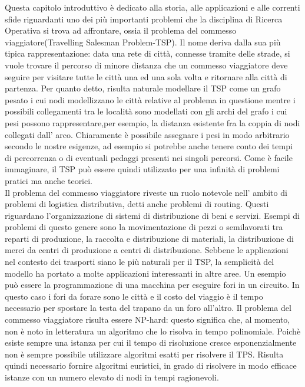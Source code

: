 \documentclass[11pt]{article}
\begin{document}
Questa capitolo introduttivo è dedicato alla storia, alle applicazioni e alle correnti sfide riguardanti uno dei più importanti problemi che la disciplina di Ricerca Operativa si trova ad affrontare, ossia il problema del commesso viaggiatore(Travelling Salesman Problem-TSP). 
Il nome deriva dalla sua più tipica rappresentazione: data una rete di città, connesse tramite delle strade, si vuole trovare il percorso di minore distanza che un commesso viaggiatore deve seguire per visitare tutte le città una ed una sola volta e ritornare alla città di partenza. Per quanto detto, risulta naturale modellare il TSP come un grafo pesato i cui nodi modellizzano le città relative al problema in questione mentre i possibili collegamenti tra le località sono modellati con gli archi del grafo i cui pesi possono rappresentare,per esempio, la distanza esistente fra la coppia di nodi collegati dall' arco. Chiaramente è possibile assegnare i pesi in modo arbitrario secondo le nostre esigenze, ad esempio si potrebbe anche tenere conto dei tempi di percorrenza o di eventuali pedaggi presenti nei singoli percorsi. Come è facile immaginare, il TSP può essere quindi utilizzato per una infinità  di problemi pratici ma anche teorici.\\
Il problema del commesso viaggiatore riveste un ruolo notevole nell' ambito di problemi di logistica distributiva, detti anche problemi di routing. Questi riguardano l'organizzazione di sistemi di distribuzione di beni e servizi. Esempi di problemi di questo genere sono la movimentazione di pezzi o semilavorati tra reparti di produzione, la raccolta e distribuzione di materiali, la distribuzione di merci da centri di produzione a centri di distribuzione.
Sebbene le applicazioni nel contesto dei trasporti siano le più naturali per il TSP, la semplicità del modello ha portato a molte applicazioni interessanti in altre aree. Un esempio può essere la programmazione di una macchina per eseguire fori in un circuito. In questo caso i fori da forare sono le città  e il costo del viaggio è il tempo necessario per spostare la testa del trapano da un foro all'altro. 
Il problema del commesso viaggiatore risulta essere NP-hard: questo significa che, al momento, non è noto in letteratura un algoritmo che lo risolva in tempo polinomiale. Poichè esiste sempre una istanza per cui il tempo di risoluzione cresce esponenzialmente non è sempre possibile utilizzare algoritmi esatti per risolvere il TPS. Risulta quindi necessario fornire algoritmi euristici, in grado di risolvere in modo efficace istanze con un numero elevato di nodi in tempi ragionevoli.
\end{document}

